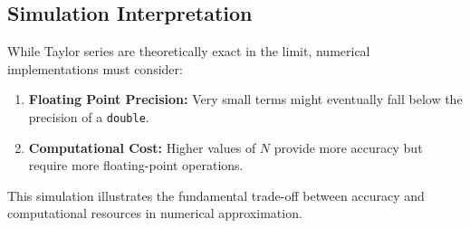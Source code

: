 \subsection*{Simulation Interpretation}

While Taylor series are theoretically exact in the limit, numerical implementations must consider:
\begin{enumerate}
    \item \textbf{Floating Point Precision:} Very small terms might eventually fall below the precision of a \texttt{double}.
    \item \textbf{Computational Cost:} Higher values of $N$ provide more accuracy but require more floating-point operations.
\end{enumerate}
This simulation illustrates the fundamental trade-off between accuracy and computational resources in numerical approximation.
